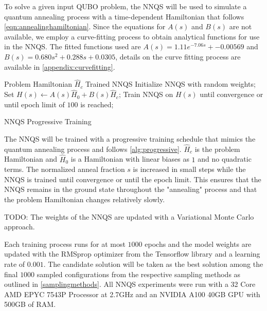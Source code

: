 To solve a given input QUBO problem, the NNQS will be used to simulate a quantum annealing process with a time-dependent Hamiltonian that follows \autoref{eqn:annealinghamiltonian}. Since the equations for $A(s)$ and $B(s)$ are not available, we employ a curve-fitting process to obtain analytical functions for use in the NNQS. The fitted functions used are $A(s) = 1.11e^{-7.06s} + -0.00569$ and $B(s)= 0.680s^2 + 0.288s + 0.0305$, details on the curve fitting process are available in \autoref{appendix:curvefitting}.

\begin{algorithm}
    \begin{algorithmic}
    \Require Problem Hamiltonian $\hat{H}_c$
    \Ensure Trained NNQS
    \State Initialize NNQS with random weights;
    \State Set $H(s) \leftarrow A(s)\hat{H}_0 + B(s)\hat{H}_c$;
    \State Train NNQS on $H(s)$ until convergence or until epoch limit of $100$ is reached;
    \EndFor
    \end{algorithmic}
    \caption{NNQS Progressive Training}
    \label{alg:progressive}
\end{algorithm}

The NNQS will be trained with a progressive training schedule that mimics the quantum annealing process and follows \autoref{alg:progressive}. $\hat{H}_c$ is the problem Hamiltonian and $\hat{H}_0$ is a Hamiltonian with linear biases as $1$ and no quadratic terms. The normalized anneal fraction $s$ is increased in small steps while the NNQS is trained until convergence or until the epoch limit. This ensures that the NNQS remains in the ground state throughout the "annealing" process and that the problem Hamiltonian changes relatively slowly. 

TODO: The weights of the NNQS are updated with a Variational Monte Carlo approach.

Each training process runs for at most $1000$ epochs and the model weights are updated with the RMSprop optimizer from the Tensorflow library and a learning rate of $0.001$. The candidate solution will be taken as the best solution among the final $1000$ sampled configurations from the respective sampling methods as outlined in \autoref{samplingmethods}. All NNQS experiments were run with a 32 Core AMD EPYC 7543P Processor at 2.7GHz and an NVIDIA A100 40GB GPU with 500GB of RAM.

